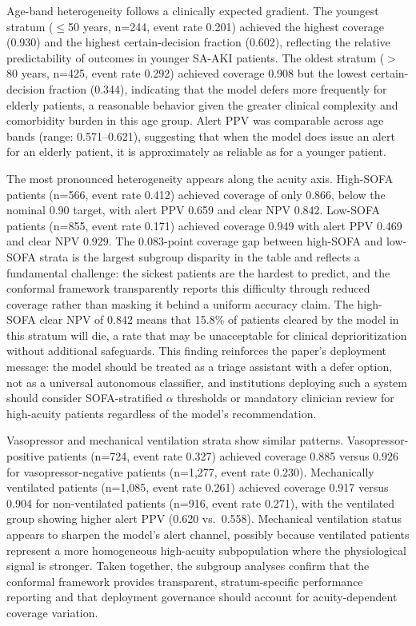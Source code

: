 Age-band heterogeneity follows a clinically expected gradient. The youngest stratum ($\leq$50 years, n=244, event rate 0.201) achieved the highest coverage (0.930) and the highest certain-decision fraction (0.602), reflecting the relative predictability of outcomes in younger SA-AKI patients. The oldest stratum ($>$80 years, n=425, event rate 0.292) achieved coverage 0.908 but the lowest certain-decision fraction (0.344), indicating that the model defers more frequently for elderly patients, a reasonable behavior given the greater clinical complexity and comorbidity burden in this age group. Alert PPV was comparable across age bands (range: 0.571--0.621), suggesting that when the model does issue an alert for an elderly patient, it is approximately as reliable as for a younger patient.

The most pronounced heterogeneity appears along the acuity axis. High-SOFA patients (n=566, event rate 0.412) achieved coverage of only 0.866, below the nominal 0.90 target, with alert PPV 0.659 and clear NPV 0.842. Low-SOFA patients (n=855, event rate 0.171) achieved coverage 0.949 with alert PPV 0.469 and clear NPV 0.929. The 0.083-point coverage gap between high-SOFA and low-SOFA strata is the largest subgroup disparity in the table and reflects a fundamental challenge: the sickest patients are the hardest to predict, and the conformal framework transparently reports this difficulty through reduced coverage rather than masking it behind a uniform accuracy claim. The high-SOFA clear NPV of 0.842 means that 15.8\% of patients cleared by the model in this stratum will die, a rate that may be unacceptable for clinical deprioritization without additional safeguards. This finding reinforces the paper's deployment message: the model should be treated as a triage assistant with a defer option, not as a universal autonomous classifier, and institutions deploying such a system should consider SOFA-stratified $\alpha$ thresholds or mandatory clinician review for high-acuity patients regardless of the model's recommendation.

Vasopressor and mechanical ventilation strata show similar patterns. Vasopressor-positive patients (n=724, event rate 0.327) achieved coverage 0.885 versus 0.926 for vasopressor-negative patients (n=1{,}277, event rate 0.230). Mechanically ventilated patients (n=1{,}085, event rate 0.261) achieved coverage 0.917 versus 0.904 for non-ventilated patients (n=916, event rate 0.271), with the ventilated group showing higher alert PPV (0.620 vs.\ 0.558). Mechanical ventilation status appears to sharpen the model's alert channel, possibly because ventilated patients represent a more homogeneous high-acuity subpopulation where the physiological signal is stronger. Taken together, the subgroup analyses confirm that the conformal framework provides transparent, stratum-specific performance reporting and that deployment governance should account for acuity-dependent coverage variation.
